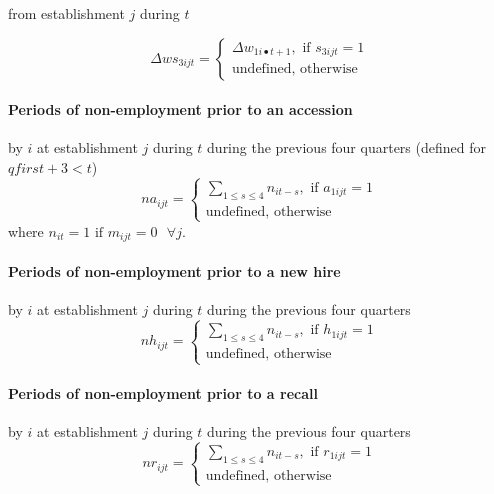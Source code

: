 from establishment $j$ during $t$

\begin{equation}
\Delta ws_{3ijt} = \left\{ 
\begin{array}{l}
{\Delta w_{1i\bullet t + 1} ,\mbox{ if }s_{3ijt} = 1} \\ 
{\mbox{undefined, otherwise}}%
\end{array}
\right.
\end{equation}

\paragraph{Periods of non-employment prior to an accession}

by $i$ at establishment $j$ during $t$ during the previous four quarters
(defined for $qfirst+3<t$)%
\begin{equation}
na_{ijt}=\left\{ 
\begin{array}{l}
{\sum\limits_{1 \leqslant s \leqslant 4} {n_{it - s} } ,\mbox{ if }a_{1ijt}
= 1} \\ 
{\mbox{undefined,
otherwise}}%
\end{array}%
\right.
\end{equation}%
where $n_{it}=1\mbox{ if }m_{ijt}=0\mbox{ }\forall j$.

\paragraph{Periods of non-employment prior to a new hire}

by $i$ at establishment $j$ during $t$ during the previous four quarters%
\begin{equation}
nh_{ijt}=\left\{ 
\begin{array}{l}
{\sum\limits_{1 \leqslant s \leqslant 4} {n_{it - s} } ,\mbox{ if }h_{1ijt}
= 1} \\ 
{\mbox{undefined,
otherwise}}%
\end{array}%
\right.
\end{equation}

\paragraph{Periods of non-employment prior to a recall}

by $i$ at establishment $j$ during $t$ during the previous four quarters%
\begin{equation}
nr_{ijt}=\left\{ 
\begin{array}{l}
{\sum\limits_{1 \leqslant s \leqslant 4} {n_{it - s} } ,\mbox{ if }r_{1ijt}
= 1} \\ 
{\mbox{undefined,
otherwise}}%
\end{array}%
\right.
\end{equation}

